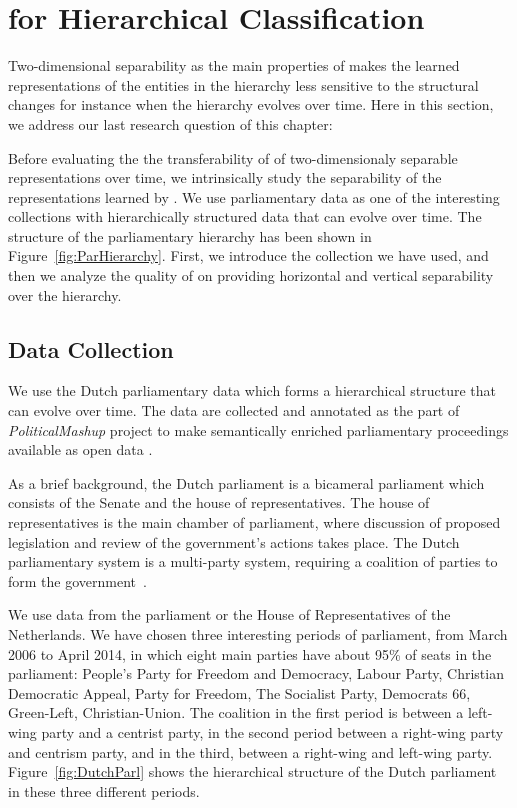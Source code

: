 \section{\achswlm for Hierarchical Classification}
Two\:-\:dimensional separability as the main properties of \achswlm makes the learned representations of the entities in the hierarchy less sensitive to the structural changes for instance when the hierarchy evolves over time. Here in this section, we address our last research question of this chapter:

Before evaluating the the transferability of of two\:-\:dimensionaly separable representations over time, we intrinsically study the separability of the representations learned by \achswlm. We use parliamentary data as one of the interesting collections with hierarchically structured data that can evolve over time. The structure of the parliamentary hierarchy has been shown in Figure~\ref{fig:ParHierarchy}.  First, we introduce the collection we have used, and then we analyze the quality of \achswlm on providing horizontal and vertical separability over the hierarchy. 

\subsection{Data Collection}
We use the Dutch parliamentary data which forms a hierarchical structure that can evolve over time. The data are collected and annotated as the part of
\emph{Political\-Mashup} project \citep{url:politicalmashup} to make semantically enriched parliamentary proceedings available as open data \citep{marx:2010}.

As a brief background, the Dutch parliament is a bicameral parliament which consists of the Senate and the house of representatives. The house of representatives is the main chamber of parliament, where discussion of proposed legislation and review of the government's actions takes place.  The Dutch parliamentary system is a multi-party system, requiring a coalition of parties to form the government~\citep{deswaan73}.


We use data from the parliament or the House of Representatives of the Netherlands.  We have chosen three interesting periods of parliament, from March 2006 to April 2014, in which eight main parties have about 95\% of seats in the parliament: People's Party for Freedom and Democracy, Labour Party, Christian Democratic Appeal, Party for Freedom, The Socialist Party, Democrats 66, Green-Left, Christian-Union.   The coalition in the first period is between a left-wing party and a centrist party, in the second period between a right-wing party and centrism party, and in the third, between a right-wing and left-wing party. Figure~\ref{fig:DutchParl} shows the hierarchical structure of the Dutch parliament in these three different periods.

